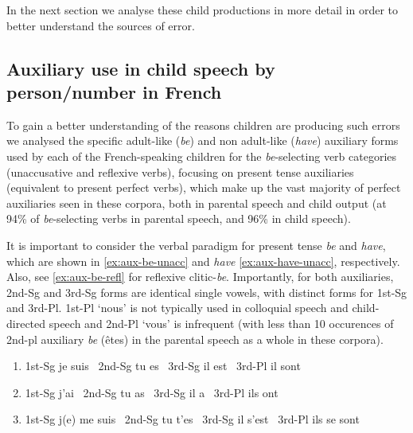 \documentclass[
  12pt,
]{article}
\begin{document}
In the next section we analyse these child productions in more detail in order to better understand the sources of error.

\hypertarget{child-person}{%
\subsection{Auxiliary use in child speech by person/number in French}\label{child-person}}

To gain a better understanding of the reasons children are producing such errors we analysed the specific adult-like (\emph{be}) and non adult-like (\emph{have}) auxiliary forms used by each of the French-speaking children for the \emph{be}-selecting verb categories (unaccusative and reflexive verbs), focusing on present tense auxiliaries (equivalent to present perfect verbs), which make up the vast majority of perfect auxiliaries seen in these corpora, both in parental speech and child output (at 94\% of \emph{be}-selecting verbs in parental speech, and 96\% in child speech).

It is important to consider the verbal paradigm for present tense \emph{be} and \emph{have}, which are shown in \ref{ex:aux-be-unacc} and \emph{have} \ref{ex:aux-have-unacc}, respectively. Also, see \ref{ex:aux-be-refl} for reflexive clitic-\emph{be}. Importantly, for both auxiliaries, 2nd-Sg and 3rd-Sg forms are identical single vowels, with distinct forms for 1st-Sg and 3rd-Pl. 1st-Pl `nous' is not typically used in colloquial speech and child-directed speech and 2nd-Pl `vous' is infrequent (with less than 10 occurences of 2nd-pl auxiliary \emph{be} (êtes) in the parental speech as a whole in these corpora).

\begin{enumerate}[resume*]
  \item   {1st-Sg    je suis \tab       \textipa{[Z(@) s4i]}\label{ex:aux-be-unacc}}\newline
  \        2nd-Sg    tu es   \tab       [t  e]\newline
  \        3rd-Sg    il est   \tab      [il e]\newline
  \        3rd-Pl    il sont  \tab     \textipa{[i  s\~O]}
  \item{1st-Sg  j'ai     \tab          \textipa{[Z e]} \label{ex:aux-have-unacc}}\newline 
  \   2nd-Sg    tu as    \tab               [t  a]\newline
  \   3rd-Sg    il a     \tab               [il a]\newline
  \   3rd-Pl    ils ont  \tab               \textipa{[iz \~O]}
 \item{1st-Sg   j(e) me suis \tab         \textipa{[Z(@) m(@) s4i]} \label{ex:aux-be-refl}}\newline 
  \   2nd-Sg    tu t'es       \tab          [ty te]\newline
  \   3rd-Sg    il s'est      \tab          [il se]\newline
  \   3rd-Pl    ils se sont   \tab          \textipa{[i(l) s@ s\~O]} 
\end{enumerate}
\end{document}
